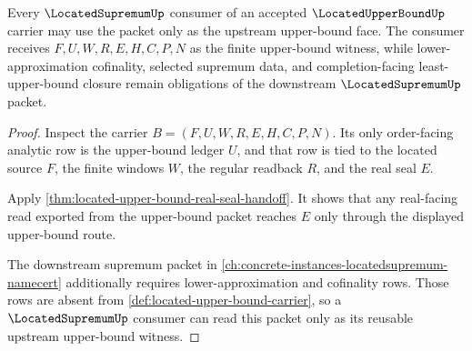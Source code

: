 \begin{theorem}
\label{thm:located-upper-bound-supremum-route}
Every $\LocatedSupremumUp$ consumer of an accepted $\LocatedUpperBoundUp$ carrier may use the packet only as the upstream upper-bound face. The consumer receives $F,U,W,R,E,H,C,P,N$ as the finite upper-bound witness, while lower-approximation cofinality, selected supremum data, and completion-facing least-upper-bound closure remain obligations of the downstream $\LocatedSupremumUp$ packet.
\end{theorem}
\begin{proof}
Inspect the carrier $B=(F,U,W,R,E,H,C,P,N)$. Its only order-facing analytic row is the upper-bound ledger $U$, and that row is tied to the located source $F$, the finite windows $W$, the regular readback $R$, and the real seal $E$.

Apply \autoref{thm:located-upper-bound-real-seal-handoff}. It shows that any real-facing read exported from the upper-bound packet reaches $E$ only through the displayed upper-bound route.

The downstream supremum packet in \autoref{ch:concrete-instances-locatedsupremum-namecert} additionally requires lower-approximation and cofinality rows. Those rows are absent from \autoref{def:located-upper-bound-carrier}, so a $\LocatedSupremumUp$ consumer can read this packet only as its reusable upstream upper-bound witness.
\end{proof}

